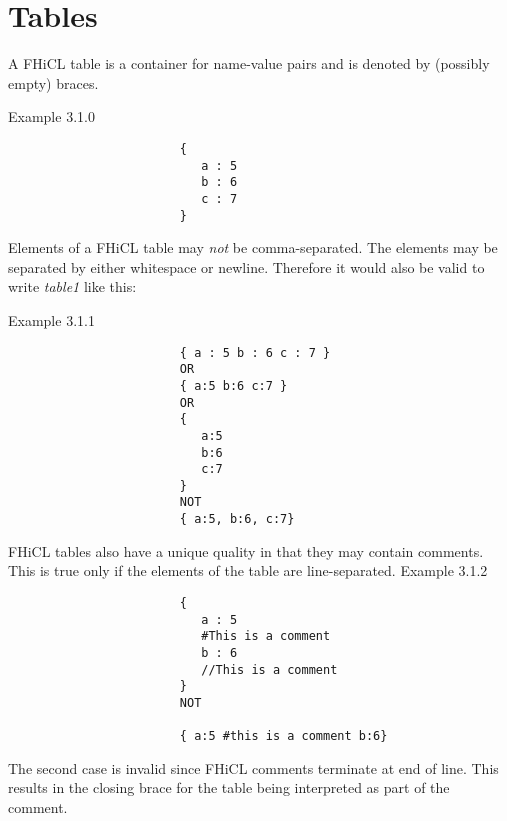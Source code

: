 \documentclass{memarticle}
\begin{document}
	\section{Tables}
                A FHiCL table is a container for name-value pairs
                and is denoted by (possibly empty) braces.
                \par
                Example 3.1.0
                \begin{verbatim}
                        {
                           a : 5
                           b : 6
                           c : 7
                        }
                \end{verbatim}
                \par
                Elements of a FHiCL table may \emph{not} be comma-separated.
                The elements may be separated by either whitespace or newline.
                Therefore it would also be valid to write \emph{table1} like this:
                \par
                Example 3.1.1
                \begin{verbatim}
                        { a : 5 b : 6 c : 7 }
                        OR
                        { a:5 b:6 c:7 }
                        OR
                        {
                           a:5
                           b:6
                           c:7
                        }
                        NOT
                        { a:5, b:6, c:7}
                \end{verbatim}
                \par
                FHiCL tables also have a unique quality in that they may contain comments.
                This is true only if the elements of the table are line-separated.
                Example 3.1.2
                \begin{verbatim}
                        {
                           a : 5
                           #This is a comment
                           b : 6
                           //This is a comment
                        }
                        NOT

                        { a:5 #this is a comment b:6}
                \end{verbatim}
                \par
                The second case is invalid since FHiCL comments terminate at end of line.
                This results in the closing brace for the table being interpreted as part of the comment.
\end{document}
